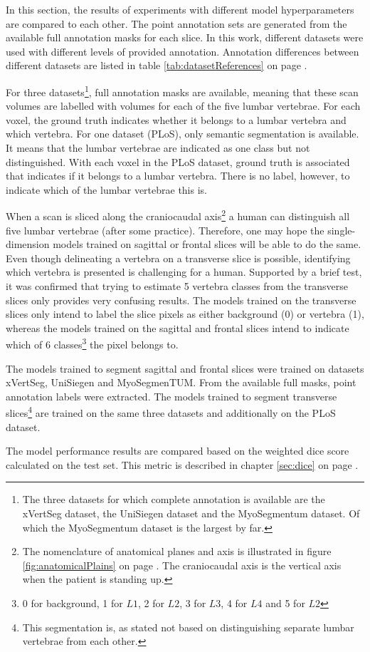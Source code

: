 \par{
    In this section, the results of experiments with different model hyperparameters are compared to each other.
    The point annotation sets are generated from the available full annotation masks for each slice.
    In this work, different datasets were used with different levels of provided annotation. 
    Annotation differences between different datasets are listed in table \ref{tab:datasetReferences} on page \pageref{tab:datasetReferences}.
}
\par{
    For three datasets\footnote{The three datasets for which complete annotation is available are the xVertSeg dataset, the UniSiegen dataset and the MyoSegmentum dataset. Of which the MyoSegmentum dataset is the largest by far.},
    full annotation masks are available, meaning that these scan volumes are labelled with volumes for each of the five lumbar vertebrae.
    For each voxel, the ground truth indicates whether it belongs to a lumbar vertebra and which vertebra.
    For one dataset (PLoS), only semantic segmentation is available. It means that the lumbar vertebrae are indicated as one class but not distinguished. 
    With each voxel in the PLoS dataset, ground truth is associated that indicates if it belongs to a lumbar vertebra. There is no label, however, to indicate which of the lumbar vertebrae this is.
}
\par{
    When a scan is sliced along the craniocaudal axis\footnote{
        The nomenclature of anatomical planes and axis is illustrated in figure \ref{fig:anatomicalPlains} on page \pageref{fig:anatomicalPlains}.
        The craniocaudal axis is the vertical axis when the patient is standing up.} 
    a human can distinguish all five lumbar vertebrae (after some practice).
    Therefore, one may hope the single-dimension models trained on sagittal or frontal slices will be able to do the same.
    Even though delineating a vertebra on a transverse slice is possible, identifying which vertebra is presented is challenging for a human.
    Supported by a brief test, it was confirmed that trying to estimate 5 vertebra classes from the transverse slices only provides very confusing results.
    The models trained on the transverse slices only intend to label the slice pixels as either background (0) or vertebra (1), 
    whereas the models trained on the sagittal and frontal slices intend to indicate which of 6 classes\footnote{0 for background, 1 for $L1$, 2 for $L2$, 3 for $L3$, 4 for $L4$ and 5 for $L2$} the pixel belongs to.
}
\par{
    The models trained to segment sagittal and frontal slices were trained on datasets xVertSeg, UniSiegen and MyoSegmenTUM.
    From the available full masks, point annotation labels were extracted.
    The models trained to segment transverse slices\footnote{This segmentation is, as stated not based on distinguishing separate lumbar vertebrae from each other.} 
    are trained on the same three datasets and additionally on the PLoS dataset.    
}
\par{
    The model performance results are compared based on the weighted dice score calculated on the test set.
    This metric is described in chapter \ref{sec:dice} on page \pageref{sec:dice}.
}


